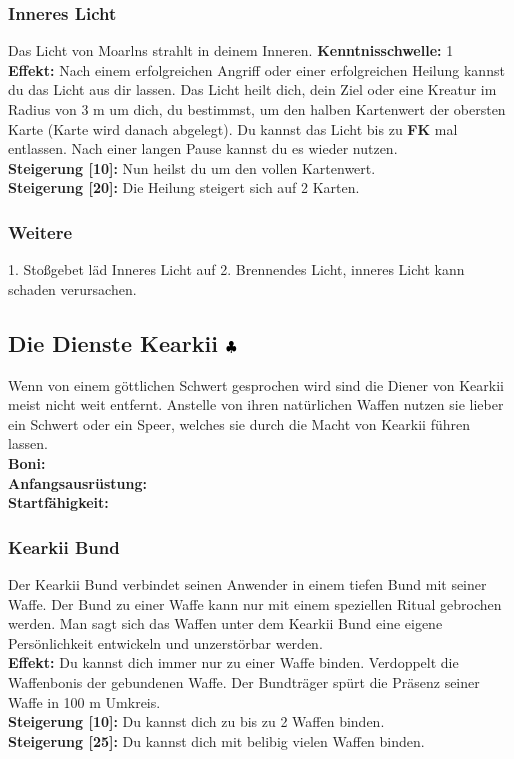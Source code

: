 \subsubsection{Inneres Licht} \label{sk:inneres_licht}
Das Licht von Moarlns strahlt in deinem Inneren.
\textbf{Kenntnisschwelle:} 1\\
\textbf{Effekt:} Nach einem erfolgreichen Angriff oder einer erfolgreichen Heilung kannst du das Licht aus dir lassen. Das Licht heilt dich, dein Ziel oder eine Kreatur im Radius von 3 m um dich, du bestimmst, um den halben Kartenwert der obersten Karte (Karte wird danach abgelegt). Du kannst das Licht bis zu \textbf{FK} mal entlassen. Nach einer langen Pause kannst du es wieder nutzen.\\
\textbf{Steigerung [10]:} Nun heilst du um den vollen Kartenwert.\\
\textbf{Steigerung [20]:} Die Heilung steigert sich auf 2 Karten.

\subsubsection*{Weitere}
1. Stoßgebet läd Inneres Licht auf
2. Brennendes Licht, inneres Licht kann schaden verursachen.


\subsection*{Die Dienste Kearkii ${\color{blue} }{\color{black}\clubsuit}$}
Wenn von einem göttlichen Schwert gesprochen wird sind die Diener von Kearkii meist nicht weit entfernt. Anstelle von ihren natürlichen Waffen nutzen sie lieber ein Schwert oder ein Speer, welches sie durch die Macht von Kearkii führen lassen.\\\textbf{Boni:} \\
\textbf{Anfangsausrüstung:} \\
\textbf{Startfähigkeit:}  \\

\subsubsection*{Kearkii Bund} \label{sk:moraln_bund}
Der Kearkii Bund verbindet seinen Anwender in einem tiefen Bund mit seiner Waffe. Der Bund zu einer Waffe kann nur mit einem speziellen  Ritual gebrochen werden. Man sagt sich das Waffen unter dem Kearkii Bund eine eigene Persönlichkeit entwickeln und unzerstörbar werden.\\
\textbf{Effekt:} Du kannst dich immer nur zu einer Waffe binden. Verdoppelt die Waffenbonis der gebundenen Waffe. Der Bundträger spürt die Präsenz seiner Waffe in 100 m Umkreis.\\
\textbf{Steigerung [10]:} Du kannst dich zu bis zu 2 Waffen binden.\\
\textbf{Steigerung [25]:} Du kannst dich mit belibig vielen Waffen binden.\\

